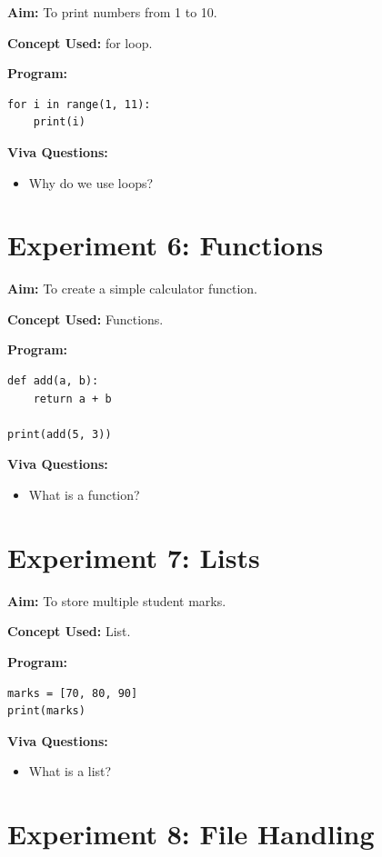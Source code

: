 \textbf{Aim:}  
To print numbers from 1 to 10.

\textbf{Concept Used:}  
for loop.

\textbf{Program:}
\begin{verbatim}
for i in range(1, 11):
    print(i)
\end{verbatim}

\textbf{Viva Questions:}
\begin{itemize}
    \item Why do we use loops?
\end{itemize}

\newpage
\section*{Experiment 6: Functions}

\textbf{Aim:}  
To create a simple calculator function.

\textbf{Concept Used:}  
Functions.

\textbf{Program:}
\begin{verbatim}
def add(a, b):
    return a + b

print(add(5, 3))
\end{verbatim}

\textbf{Viva Questions:}
\begin{itemize}
    \item What is a function?
\end{itemize}

\newpage
\section*{Experiment 7: Lists}

\textbf{Aim:}  
To store multiple student marks.

\textbf{Concept Used:}  
List.

\textbf{Program:}
\begin{verbatim}
marks = [70, 80, 90]
print(marks)
\end{verbatim}

\textbf{Viva Questions:}
\begin{itemize}
    \item What is a list?
\end{itemize}

\newpage
\section*{Experiment 8: File Handling}


